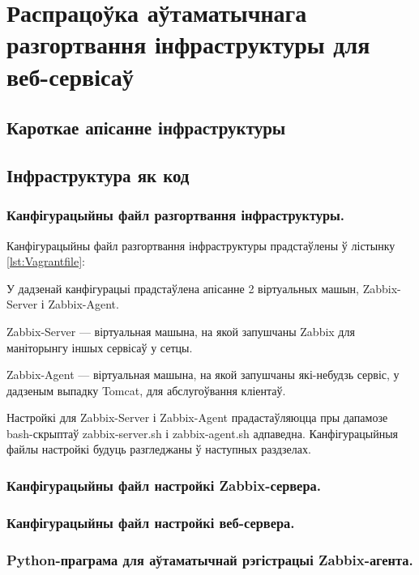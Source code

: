 \section{Распрацоўка аўтаматычнага разгортвання інфраструктуры для веб-сервісаў}

\subsection{Кароткае апісанне інфраструктуры}

\subsection{Інфраструктура як код}

\subsubsection{Канфігурацыйны файл разгортвання інфраструктуры.}
Канфігурацыйны файл разгортвання інфраструктуры прадстаўлены ў лістынку
\ref{lst:Vagrantfile}:



У дадзенай канфігурацыі прадстаўлена апісанне 2 віртуальных машын,
Zabbix-Server і Zabbix-Agent.

Zabbix-Server --- віртуальная машына, на якой запушчаны Zabbix для
маніторынгу іншых сервісаў у сетцы.

Zabbix-Agent --- віртуальная машына, на якой запушчаны які-небудзь сервіс,
у дадзеным выпадку Tomcat, для абслугоўвання кліентаў.

Настройкі для Zabbix-Server і Zabbix-Agent прадастаўляюцца пры дапамозе
bash-скрыптаў zabbix-server.sh і zabbix-agent.sh адпаведна.
Канфігурацыйныя файлы настройкі будуць разгледжаны ў наступных раздзелах.

\subsubsection{Канфігурацыйны файл настройкі Zabbix-сервера.}


\subsubsection{Канфігурацыйны файл настройкі веб-сервера.}


\subsubsection{Python-праграма для аўтаматычнай рэгістрацыі Zabbix-агента.}

